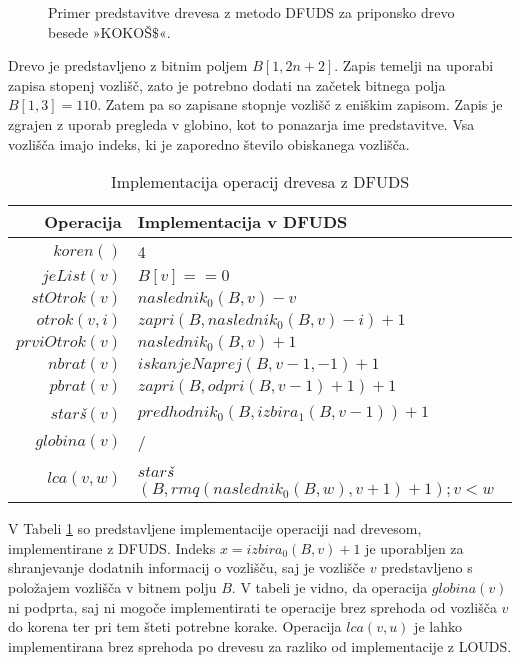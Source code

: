 \begin{figure}[htb]
    \begin{center}
        
        \caption{Primer predstavitve drevesa z metodo DFUDS za priponsko drevo besede »KOKOŠ$\$$«.} 
        \label{fig:DFUDS}
    \end{center}
\end{figure}

Drevo je predstavljeno z bitnim poljem $B[1,2n+2]$. Zapis temelji na uporabi zapisa stopenj vozlišč, zato je potrebno dodati na začetek bitnega polja $B[1,3]=110$. Zatem pa so zapisane stopnje vozlišč z eniškim zapisom. Zapis je zgrajen z uporab pregleda v globino, kot to ponazarja ime predstavitve. Vsa vozlišča imajo indeks, ki je zaporedno število obiskanega vozlišča.

\begin{table}[htb]
    \centering
    \caption{Implementacija operacij drevesa z DFUDS}
    \begin{tabular}{r|l}
\textbf{Operacija}& \textbf{Implementacija v DFUD}S \\\hline
         $koren()$& 4\\
         $jeList(v)$& $B[v]==0$\\
         $stOtrok(v)$& $naslednik_0(B,v)-v$\\
         $otrok(v,i)$& $zapri(B, naslednik_0(B, v) - i)+1$\\
         $prviOtrok(v)$& $naslednik_0(B,v)+1$\\
         $nbrat(v)$& $iskanjeNaprej(B,v-1,-1)+1$ \\
         $pbrat(v)$& $zapri(B,odpri(B,v-1)+1)+1$ \\
         $star$\textit{š}$(v)$& $predhodnik_0(B,izbira_1(B,v-1))+1$ \\
         $globina(v)$& / \\
         $lca(v,w)$&  $star$\textit{š}$(B,rmq(naslednik_0(B,w),v+1)+1);v<w$\\

    \end{tabular}
    \label{tab:DFUDSop}
\end{table}

V Tabeli \ref{tab:DFUDSop} so predstavljene implementacije operaciji nad drevesom, implementirane z DFUDS. Indeks  $x=izbira_0(B,v)+1$ je uporabljen za shranjevanje dodatnih informacij o vozlišču, saj je vozlišče $v$ predstavljeno s položajem vozlišča v bitnem polju $B$. V tabeli je vidno, da operacija $globina(v)$ ni podprta, saj ni mogoče implementirati te operacije brez sprehoda od vozlišča $v$ do korena ter pri tem šteti potrebne korake. Operacija $lca(v,u)$ je lahko implementirana brez sprehoda po drevesu za razliko od implementacije z LOUDS.


